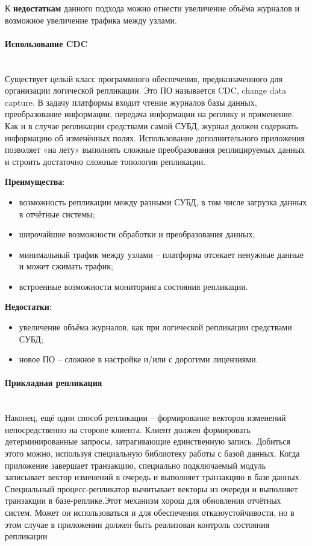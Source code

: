 К \textbf{недостаткам} данного подхода можно отнести увеличение объёма журналов и возможное увеличение трафика между
узлами.

\paragraph{Использование CDC} ~\\
Существует целый класс программного обеспечения, предназначенного для организации логической репликации. Это ПО
называется CDC, change data capture. В задачу платформы входит чтение журналов базы данных, преобразование информации,
передача информации на реплику и применение. Как и в случае репликации средствами самой СУБД, журнал должен содержать
информацию об изменённых полях. Использование дополнительного приложения позволяет «на лету» выполнять сложные
преобразования реплицируемых данных и строить достаточно сложные топологии репликации.

\textbf{Преимущества}:
\begin{itemize}
    \item возможность репликации между разными СУБД, в том числе загрузка данных в отчётные системы;
    \item широчайшие возможности обработки и преобразования данных;
    \item минимальный трафик между узлами – платформа отсекает ненужные данные и может сжимать трафик;
    \item встроенные возможности мониторинга состояния репликации.
\end{itemize}

\textbf{Недостатки}:
\begin{itemize}
    \item увеличение объёма журналов, как при логической репликации средствами СУБД;
    \item новое ПО – сложное в настройке и/или с дорогими лицензиями.
\end{itemize}

\paragraph{Прикладная репликация} ~\\
Наконец, ещё один способ репликации – формирование векторов изменений непосредственно на стороне клиента. Клиент должен
формировать детерминированные запросы, затрагивающие единственную запись. Добиться этого можно, используя специальную
библиотеку работы с базой данных. Когда приложение завершает транзакцию, специально подключаемый модуль записывает
вектор изменений в очередь и выполняет транзакцию в базе данных. Специальный процесс-репликатор вычитывает векторы из
очереди и выполняет транзакции в базе-реплике.Этот механизм хорош для обновления отчётных систем. Может он
использоваться и для обеспечения отказоустойчивости, но в этом случае в приложении должен быть реализован контроль
состояния репликации

